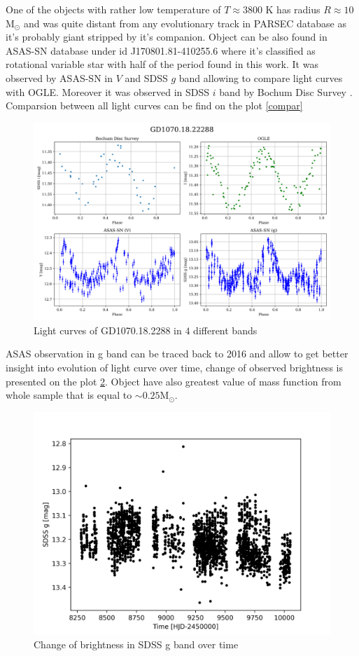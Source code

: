 \documentclass{pracalicmgr}
\begin{document}
One of the objects with rather low temperature of 
$T\approx 3800$ K has radius $R\approx 10$ $\textrm{M}_{\odot}$ and was quite distant from any evolutionary track in PARSEC database as it's probably giant stripped by 
it's companion. Object can be also found in ASAS-SN database \citep{jayasinghe_asas-sn_2019} under id J170801.81-410255.6 where it's classified as rotational variable star
with half of the period found in this work. It was observed by ASAS-SN in $V$ and SDSS $g$ band allowing to compare light curves with OGLE. Moreover 
it was observed in SDSS $i$ band by Bochum Disc Survey \citep{hackstein_bochum_2015}. Comparsion between all light curves can be find on the plot \ref{compar}
\begin{figure}[H]
    \includegraphics[scale=0.5]{plots/GD1070.18.22288/lc_comparsion.png}
    \caption{Light curves of GD1070.18.2288 in $4$ different bands}\label{comp}
\end{figure}
ASAS observation in g band can be traced back to 2016 and allow to get better insight into evolution of light curve over time, change of observed brightness is presented on the
plot \ref{evolution}. Object have also greatest value of mass function from whole sample that is equal to $\sim 0.25 \textrm{M}_{\odot}$. 

\begin{figure}[H]
    \includegraphics{plots/GD1070.18.22288/visibility_over_time.png}
    \caption{Change of brightness in SDSS g band over time  }\label{evolution}
\end{figure}
\end{document}
